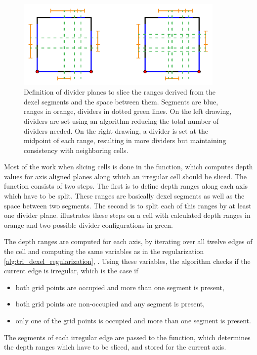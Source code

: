 \begin{figure}
	\centering
	\includegraphics[width=0.9\textwidth]{images/cellslicing_dividers}
	\caption{
		Definition of divider planes to slice the ranges derived from the dexel segments and the space between them.
		Segments are blue, ranges in orange, dividers in dotted green lines.
		On the left drawing, dividers are set using an algorithm reducing the total number of dividers needed.
		On the right drawing, a divider is set at the midpoint of each range, resulting in more dividers but maintaining consistency with neighboring cells.
	}
	\label{fig:cellslicing_dividers}
\end{figure}

Most of the work when slicing cells is done in the  function, which computes depth values for axis aligned planes along which an irregular cell should be sliced.
The function consists of two steps.
The first is to define depth ranges along each axis which have to be split.
These ranges are basically dexel segments as well as the space between two segments.
The second is to split each of this ranges by at least one divider plane.
 illustrates these steps on a cell with calculated depth ranges in orange and two possible divider configurations in green.

The depth ranges are computed for each axis, by iterating over all twelve edges of the cell and computing the same variables as in the regularization \cref{alg:tri_dexel_regularization}, .
Using these variables, the algorithm checks if the current edge is irregular, which is the case if
\begin{itemize}
	\item both grid points are occupied and more than one segment is present,
	\item both grid points are non-occupied and any segment is present,
	\item only one of the grid points is occupied and more than one segment is present.
\end{itemize}
The segments of each irregular edge are passed to the  function, which determines the depth ranges which have to be sliced, and stored for the current axis.

